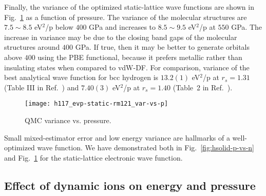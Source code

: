 Finally, the variance of the optimized static-lattice wave functions are shown in Fig.~\ref{fig:hsolid-v-vs-p} as a function of pressure.
The variance of the molecular structures are $7.5\sim8.5$ eV$^2$/p below $400$ GPa and increases to $8.5\sim9.5$ eV$^2$/p at $550$ GPa.
The increase in variance may be due to the closing band gaps of the molecular structures around $400$ GPa.
If true, then it may be better to generate orbitals above $400$ using the PBE functional, because it prefers metallic rather than insulating states when compared to vdW-DF.
For comparison, variance of the best analytical wave function for bcc hydrogen is $13.2(1)$ eV$^2$/p at $r_s=1.31$ (Table III in Ref.~\cite{Holzmann2003}) and $7.40(3)$ eV$^2$/p at $r_s=1.40$ (Table~2 in Ref.~\cite{Pierleoni2008}).

\begin{figure}[h]
\centering
\texttt{[image: h117\_evp-static-rm121\_var-vs-p]}
\caption{QMC variance vs. pressure.}
\label{fig:hsolid-v-vs-p}
\end{figure}

Small mixed-estimator error and low energy variance are hallmarks of a well-optimized wave function. We have demonstrated both in Fig.~\ref{fig:hsolid-p-vs-n} and Fig.~\ref{fig:hsolid-v-vs-p} for the static-lattice electronic wave function.

%
%

\subsection{Effect of dynamic ions on energy and pressure}

